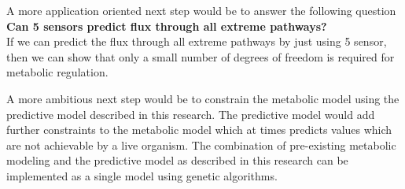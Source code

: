 \documentclass[12pt,chapterheads]{ucsd}
\begin{document}
A more application oriented next step would be to answer the following question\\
\textbf{Can 5 sensors predict flux through all extreme pathways?}\\
If we can predict the flux through all extreme pathways by just using 5 sensor, then we can show that only a small number of degrees of freedom is required for metabolic regulation.

A more ambitious next step would be to constrain the metabolic model using the predictive model described in this research. The predictive model would add further constraints to the metabolic model which at times predicts values which are not achievable by a live organism. The combination of pre-existing metabolic modeling and the predictive model as described in this research can be implemented as a single model using genetic algorithms.

\def\baselinestretch{1.0}  %
\end{document}
